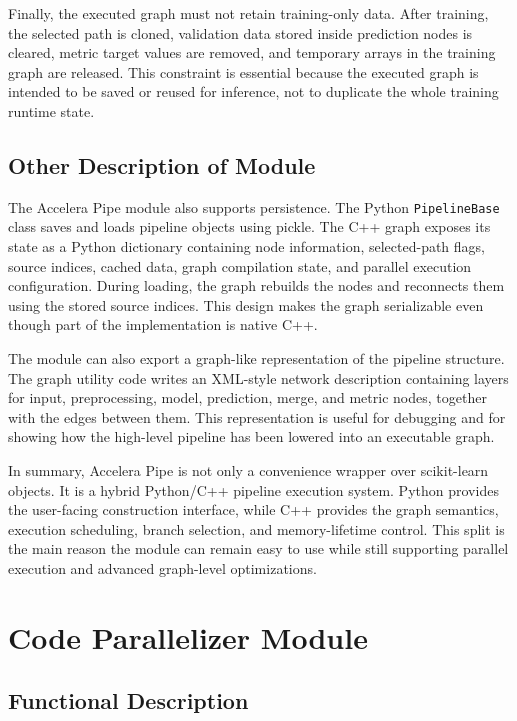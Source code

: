Finally, the executed graph must not retain training-only data. After training,
the selected path is cloned, validation data stored inside prediction nodes is
cleared, metric target values are removed, and temporary arrays in the training
graph are released. This constraint is essential because the executed graph is
intended to be saved or reused for inference, not to duplicate the whole training
runtime state.

\subsection{Other Description of Module}

The Accelera Pipe module also supports persistence. The Python \texttt{PipelineBase}
class saves and loads pipeline objects using pickle. The C++ graph exposes its
state as a Python dictionary containing node information, selected-path flags,
source indices, cached data, graph compilation state, and parallel execution
configuration. During loading, the graph rebuilds the nodes and reconnects them
using the stored source indices. This design makes the graph serializable even
though part of the implementation is native C++.

The module can also export a graph-like representation of the pipeline structure.
The graph utility code writes an XML-style network description containing layers
for input, preprocessing, model, prediction, merge, and metric nodes, together
with the edges between them. This representation is useful for debugging and for
showing how the high-level pipeline has been lowered into an executable graph.

In summary, Accelera Pipe is not only a convenience wrapper over scikit-learn
objects. It is a hybrid Python/C++ pipeline execution system. Python provides the
user-facing construction interface, while C++ provides the graph semantics,
execution scheduling, branch selection, and memory-lifetime control. This split
is the main reason the module can remain easy to use while still supporting
parallel execution and advanced graph-level optimizations.

\section{Code Parallelizer Module}

\subsection{Functional Description}

